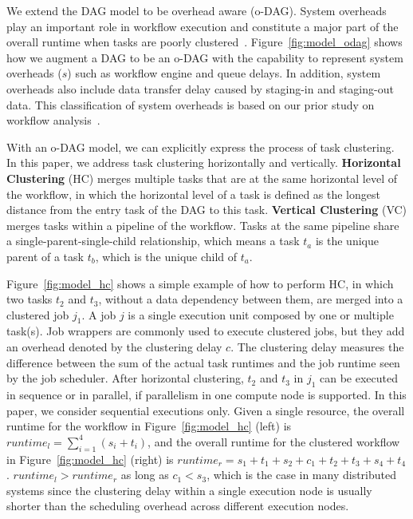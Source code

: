 We extend the DAG model to be overhead aware (o-DAG). System overheads play an important role in workflow execution and constitute a major part of the overall runtime when tasks are poorly clustered~\cite{Chen2011}. Figure~\ref{fig:model_odag} shows how we augment a DAG to be an o-DAG with the capability to represent system overheads ($s$) such as workflow engine and queue delays. In addition, system overheads also include data transfer delay caused by staging-in and staging-out data. This classification of system overheads is based on our prior study on workflow analysis~\cite{Chen2011}. 

With an o-DAG model, we can explicitly express the process of task clustering. In this paper, we address task clustering horizontally and vertically. \textbf{Horizontal Clustering} (HC) merges multiple tasks that are at the same horizontal level of the workflow, in which the horizontal level of a task is defined as the longest distance from the entry task of the DAG to this task. \textbf{Vertical Clustering} (VC) merges tasks within a pipeline of the workflow. Tasks at the same pipeline share a single-parent-single-child relationship, which means a task $t_a$ is the unique parent of a task $t_b$, which is the unique child of $t_a$. 

Figure~\ref{fig:model_hc} shows a simple example of how to perform HC, in which two tasks $t_2$ and $t_3$, without a data dependency between them, are merged into a clustered job $j_1$. A job $j$ is a single execution unit composed by one or multiple task(s). Job wrappers are commonly used to execute clustered jobs, but they add an overhead denoted by the clustering delay $c$. The clustering delay measures the difference between the sum of the actual task runtimes and the job runtime seen by the job scheduler. 
After horizontal clustering, $t_2$ and $t_3$ in $j_1$ can be executed in sequence or in parallel, if parallelism in one compute node is supported. In this paper, we consider sequential executions only. Given a single resource, the overall runtime for the workflow in Figure~\ref{fig:model_hc} (left) is $runtime_l= \sum_{i=1}^{4}(s_i+t_i)$, and the overall runtime for the clustered workflow in Figure~\ref{fig:model_hc} (right) is $runtime_r=s_1+t_1+s_2+c_1+t_2+t_3+s_4+t_4$.  $runtime_l > runtime_r$ as long as $c_1 < s_3$, which is the case in many distributed systems since the clustering delay within a single execution node is usually shorter than the scheduling overhead across different execution nodes. 

